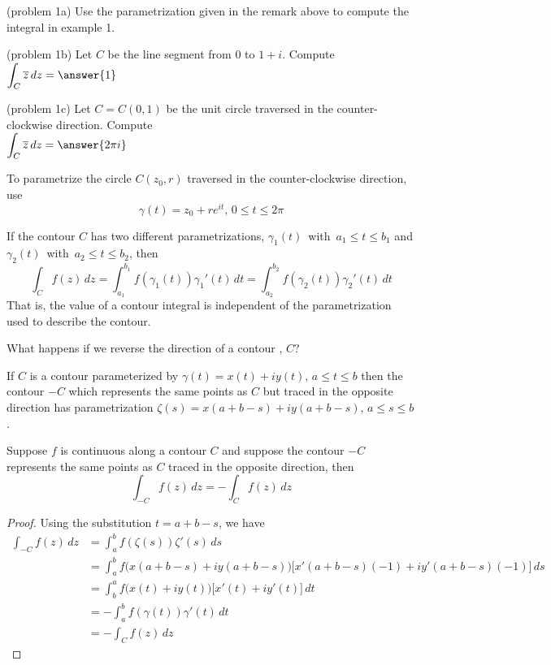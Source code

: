 \documentclass[handout]{ximera}
\begin{document}
\begin{problem}(problem 1a)
Use the parametrization given in the remark above to compute the integral in example 1.
\end{problem}

\begin{problem}(problem 1b)
Let $C$ be the line segment from $0$ to $1+i$. Compute \\
$\dis \int_C \overline{z} \, dz = \answer{1} $\\
\end{problem}

\begin{problem}(problem 1c)
Let $C= C(0, 1)$ be the unit circle traversed in the counter-clockwise direction. Compute \\
$\dis \int_C \overline{z} \, dz = \answer{2\pi i} $\\
\begin{hint}
To parametrize the circle $C(z_0, r)$ traversed in the counter-clockwise direction, use
\[
\gamma(t) = z_0 + re^{it}, \, 0 \leq t \leq 2\pi
\]
\end{hint}
\end{problem}


\begin{proposition}
If the contour $C$ has two different parametrizations, $\gamma_1(t)\,$ with  $\, a_1 \leq t \leq b_1$ and $\gamma_2(t)\,$ with $ \, a_2 \leq t \leq b_2$, then
\[
\int_C f(z) \, dz = \int_{a_1}^{b_1} f(\gamma_1(t)) \gamma_1'(t) \, dt = \int_{a_2}^{b_2} f(\gamma_2(t)) \gamma_2'(t) \, dt
\]
That is, the value of a contour integral is independent of the parametrization used to describe the contour.
\end{proposition}

What happens if we reverse the direction of a contour , $C$?


If $C$ is a contour parameterized by $\gamma(t) = x(t) + iy(t), \, a \leq t \leq b$ then the contour $-C$ which represents the 
same points as $C$ but traced in the opposite 
direction has parametrization $\zeta(s) = x(a+b-s) + iy(a+b-s), \, a \leq s \leq b$.


\begin{proposition}
Suppose $f$ is continuous along a contour $C$ %
and suppose the contour $-C$ represents the same points as $C$ traced in the opposite direction, 
then 
\[
\int_{-C} f(z) \, dz = -\int_C f(z) \, dz
\]
\end{proposition}
\begin{proof}
Using the substitution $t = a+b-s$, we have
\begin{align*}
\int_{-C} f(z) \, dz &= \int_a^b f(\zeta(s)) \zeta'(s) \, ds \\
&= \int_a^b f\big(x(a+b-s) + iy(a+b-s)\big) \big[x'(a+b-s)(-1)+ iy'(a+b-s)(-1)\big]\, ds\\
                     &= \int_b^a f\big(x(t)+iy(t)\big) \big[x'(t)+ iy'(t)\big] \, dt\\
                     &= -\int_a^b f(\gamma(t)) \gamma'(t) \, dt\\
                   &= - \int_C f(z) \, dz
\end{align*}
\end{proof}
\end{document}
